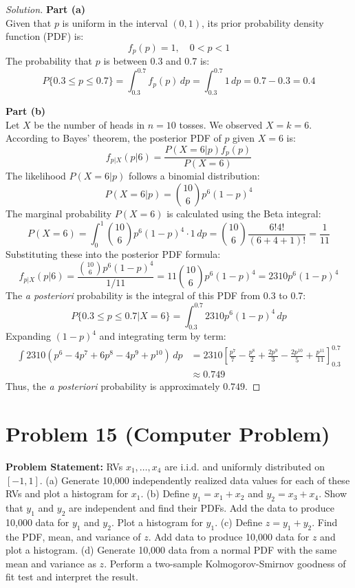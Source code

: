 \documentclass{article}
\begin{document}
\begin{proof}[Solution]
	\textbf{Part (a)} \\
	Given that $p$ is uniform in the interval $(0, 1)$, its prior probability density function (PDF) is:
	\[
		f_p(p) = 1, \quad 0 < p < 1
	\]
	The probability that $p$ is between 0.3 and 0.7 is:
	\[
		P\{0.3 \le p \le 0.7\} = \int_{0.3}^{0.7} f_p(p) \, dp = \int_{0.3}^{0.7} 1 \, dp = 0.7 - 0.3 = 0.4
	\]

	\textbf{Part (b)} \\
	Let $X$ be the number of heads in $n=10$ tosses. We observed $X=k=6$.
	According to Bayes' theorem, the posterior PDF of $p$ given $X=6$ is:
	\[
		f_{p|X}(p|6) = \frac{P(X=6|p) f_p(p)}{P(X=6)}
	\]
	The likelihood $P(X=6|p)$ follows a binomial distribution:
	\[
		P(X=6|p) = \binom{10}{6} p^6 (1-p)^4
	\]
	The marginal probability $P(X=6)$ is calculated using the Beta integral:
	\[
		P(X=6) = \int_{0}^{1} \binom{10}{6} p^6 (1-p)^4 \cdot 1 \, dp = \binom{10}{6} \frac{6! 4!}{(6+4+1)!} = \frac{1}{11}
	\]
	Substituting these into the posterior PDF formula:
	\[
		f_{p|X}(p|6) = \frac{\binom{10}{6} p^6 (1-p)^4}{1/11} = 11 \binom{10}{6} p^6 (1-p)^4 = 2310 p^6 (1-p)^4
	\]
	The \textit{a posteriori} probability is the integral of this PDF from 0.3 to 0.7:
	\[
		P\{0.3 \le p \le 0.7 | X=6\} = \int_{0.3}^{0.7} 2310 p^6 (1-p)^4 \, dp
	\]
	Expanding $(1-p)^4$ and integrating term by term:
	\begin{align*}
		\int 2310 (p^6 - 4p^7 + 6p^8 - 4p^9 + p^{10}) \, dp &= 2310 \left[ \frac{p^7}{7} - \frac{p^8}{2} + \frac{2p^9}{3} - \frac{2p^{10}}{5} + \frac{p^{11}}{11} \right]_{0.3}^{0.7} \\
		&\approx 0.749
	\end{align*}
	Thus, the \textit{a posteriori} probability is approximately $0.749$.
\end{proof}

\vspace{1cm}

\section*{Problem 15 (Computer Problem)}
\textbf{Problem Statement:}
RVs $x_1, \dots, x_4$ are i.i.d. and uniformly distributed on $[-1, 1]$.
(a) Generate 10,000 independently realized data values for each of these RVs and plot a histogram for $x_1$.
(b) Define $y_1 = x_1 + x_2$ and $y_2 = x_3 + x_4$. Show that $y_1$ and $y_2$ are independent and find their PDFs. Add the data to produce 10,000 data for $y_1$ and $y_2$. Plot a histogram for $y_1$.
(c) Define $z = y_1 + y_2$. Find the PDF, mean, and variance of $z$. Add data to produce 10,000 data for $z$ and plot a histogram.
(d) Generate 10,000 data from a normal PDF with the same mean and variance as $z$. Perform a two-sample Kolmogorov-Smirnov goodness of fit test and interpret the result.
\end{document}
